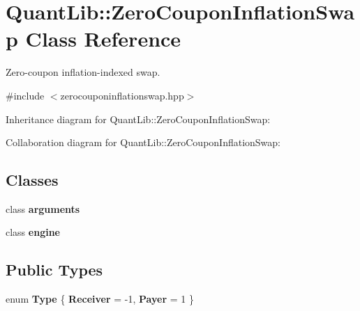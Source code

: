 \section{Quant\+Lib\+:\+:Zero\+Coupon\+Inflation\+Swap Class Reference}
\label{class_quant_lib_1_1_zero_coupon_inflation_swap}


Zero-\/coupon inflation-\/indexed swap.  




{\ttfamily \#include $<$zerocouponinflationswap.\+hpp$>$}



Inheritance diagram for Quant\+Lib\+:\+:Zero\+Coupon\+Inflation\+Swap\+:


Collaboration diagram for Quant\+Lib\+:\+:Zero\+Coupon\+Inflation\+Swap\+:
\subsection*{Classes}
\begin{DoxyCompactItemize}
\item 
class {\bf arguments}
\item 
class {\bf engine}
\end{DoxyCompactItemize}
\subsection*{Public Types}
\begin{DoxyCompactItemize}
\item 
enum {\bfseries Type} \{ {\bfseries Receiver} = -\/1, 
{\bfseries Payer} = 1
 \}\label{class_quant_lib_1_1_zero_coupon_inflation_swap_a5f9792139420279a7ce2769272d772f6}

\end{DoxyCompactItemize}
